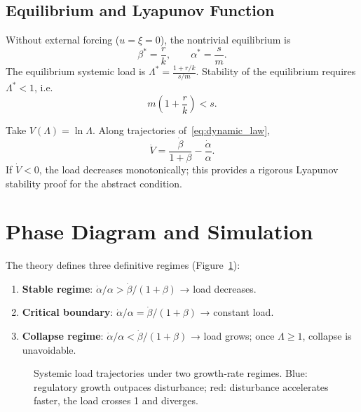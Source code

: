 \documentclass[11pt]{article}
\begin{document}
\subsection{Equilibrium and Lyapunov Function}
Without external forcing (\(u=\xi=0\)), the nontrivial equilibrium is
\[
\beta^* = \frac{r}{k},\qquad \alpha^* = \frac{s}{m}.
\]
The equilibrium systemic load is \(\Lambda^* = \frac{1 + r/k}{s/m}\). Stability of the equilibrium requires \(\Lambda^*<1\), i.e.
\[
m\left(1+\frac{r}{k}\right) < s .
\]

Take \(V(\Lambda) = \ln\Lambda\). Along trajectories of~\eqref{eq:dynamic_law},
\[
\dot V = \frac{\dot\beta}{1+\beta} - \frac{\dot\alpha}{\alpha} .
\]
If \(\dot V < 0\), the load decreases monotonically; this provides a rigorous Lyapunov stability proof for the abstract condition.

\section{Phase Diagram and Simulation}
\label{sec:phase}
The theory defines three definitive regimes (Figure~\ref{fig:trajectories}):
\begin{enumerate}[leftmargin=2em]
    \item \textbf{Stable regime}: \(\dot\alpha/\alpha > \dot\beta/(1+\beta)\) → load decreases.
    \item \textbf{Critical boundary}: \(\dot\alpha/\alpha = \dot\beta/(1+\beta)\) → constant load.
    \item \textbf{Collapse regime}: \(\dot\alpha/\alpha < \dot\beta/(1+\beta)\) → load grows; once \(\Lambda\ge1\), collapse is unavoidable.
\end{enumerate}

\begin{figure}[htbp]
\centering
{}
\caption{Systemic load trajectories under two growth‑rate regimes. Blue: regulatory growth outpaces disturbance; red: disturbance accelerates faster, the load crosses 1 and diverges.}
\label{fig:trajectories}
\end{figure}
\end{document}
